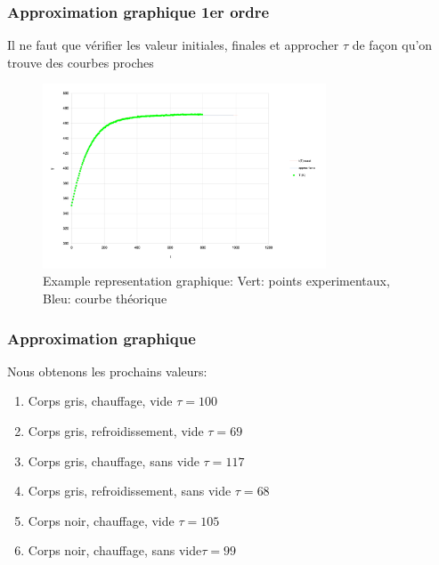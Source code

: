 \documentclass{beamer}
\begin{document}
\begin{frame}
\frametitle{Approximation graphique 1er ordre}

Il ne faut que vérifier les valeur initiales, finales et approcher $\tau$ de façon qu'on trouve des courbes proches

\begin{figure}
\includegraphics[width=0.75\textwidth]{Fig/t1-100-t2-82.png}
\caption{Example representation graphique: Vert: points experimentaux, Bleu: courbe théorique}
\end{figure}

\end{frame}





\begin{frame}
\frametitle{Approximation graphique}

Nous obtenons les prochains valeurs:
\begin{enumerate}
	\item{{\color{gray7}Corps gris}{\color{gray4}, {\color{red}chauffage}, vide} \hfill $\tau = 100$\hspace{4em} \newline}
	\item{{\color{gray7}Corps gris}{\color{gray4}, {\color{blue5}refroidissement}, vide} \hfill $\tau = 69$\hspace{4em} \newline}
	\item{{\color{gray7}Corps gris}{\color{gray4}, {\color{red}chauffage}, sans vide} \hfill $\tau = 117$\hspace{4em} \newline}
	\item{{\color{gray7}Corps gris}{\color{gray4}, {\color{blue5}refroidissement}, sans vide} \hfill $\tau = 68$\hspace{4em} \newline}
	\item{{\color{black}Corps noir}{\color{gray4}, {\color{red}chauffage}, vide} \hfill $\tau = 105$\hspace{4em} \newline}
	\item{{\color{black}Corps noir}{\color{gray4}, {\color{red}chauffage}, sans vide}\hfill $\tau = 99$\hspace{4em} \newline}
\end{enumerate}
\end{frame}
\end{document}

